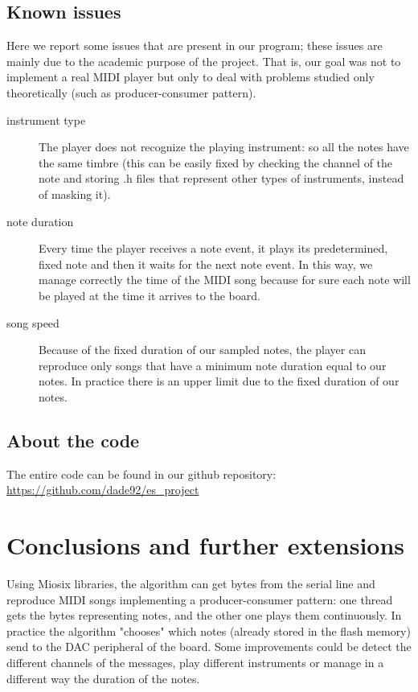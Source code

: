 \documentclass[12pt]{article}
\begin{document}
\subsection{Known issues}
Here we report some issues that are present in our program; these issues are mainly due to the academic purpose of the project. That is, our goal was not to implement a real MIDI player but only to deal with problems studied only theoretically (such as producer-consumer pattern).
\begin{description}
	\item[instrument type] The player does not recognize the playing instrument: so all the notes have the same timbre (this can be easily fixed by checking the channel of the note and storing .h files that represent other types of instruments, instead of masking it).
	\item[note duration] Every time the player receives a note event, it plays its predetermined, fixed note and then it waits for the next note event. In this way, we manage correctly the time of the MIDI song because for sure each note will be played at the time it arrives to the board.
	\item[song speed] Because of the fixed duration of our sampled notes, the player can reproduce only songs that have a minimum note duration equal to our notes. In practice there is an upper limit due to the fixed duration of our notes.
\end{description}

\subsection{About the code}
The entire code can be found in our github repository: \url{https://github.com/dade92/es_project}

\section{Conclusions and further extensions}
Using Miosix libraries, the algorithm can get bytes from the serial line and reproduce MIDI songs implementing a producer-consumer pattern: one thread gets the bytes representing notes, and the other one plays them continuously. In practice the algorithm "chooses" which notes (already stored in the flash memory) send to the DAC peripheral of the board. Some improvements could be detect the different channels of the messages, play different instruments or manage in a different way the duration of the notes.
\end{document}
